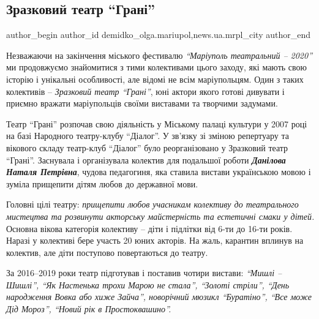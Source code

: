  
 
 
 
 
 
\subsection{Зразковий театр \enquote{Грані}}
\label{sec:25_10_2020.stz.news.ua.mrpl_city.1.zrazkovyj_teatr_grani}
 
\ifcmt
 author_begin
   author_id demidko_olga.mariupol,news.ua.mrpl_city
 author_end
\fi

Незважаючи на закінчення міського фестивалю \emph{\enquote{Маріуполь театральний – 2020}} ми
продовжуємо знайомитися з тими колективами цього заходу, які мають свою історію
і унікальні особливості, але відомі не всім маріупольцям. Один з таких
колективів – \emph{Зразковий театр \enquote{Грані}}, юні актори якого готові дивувати і
приємно вражати маріупольців своїми виставами та творчими задумами.


Театр \enquote{Грані} розпочав свою діяльність у Міському палаці культури у 2007 році
на базі Народного театру-клубу \enquote{Діалог}. У зв'язку зі зміною репертуару та
вікового складу театр-клуб \enquote{Діалог} було реорганізовано у Зразковий театр
\enquote{Грані}. Заснувала і організувала колектив для подальшої роботи \emph{\textbf{Данілова Наталя
Петрівна}}, чудова педагогиня, яка ставила вистави українською мовою і зуміла
прищепити дітям любов до державної мови.

Головні цілі театру: \emph{прищепити любов учасникам колективу до театрального
мистецтва та розвинути акторську майстерність та естетичні смаки у дітей.}
Основна вікова категорія колективу – діти і підлітки від 6-ти до 16-ти років.
Наразі у колективі бере участь 20 юних акторів. На жаль, карантин вплинув на
колектив, але діти поступово повертаються до театру.

За 2016–2019 роки театр підготував і поставив чотири вистави: \emph{\enquote{Мишлі – Шишлі},
\enquote{Як Настенька трохи Марою не стала}, \enquote{Золоті стріли}, \enquote{День народження Вовка
або хиже Зайча}, новорічний мюзикл \enquote{Буратіно}, \enquote{Все може Дід Мороз}, \enquote{Новий рік
в Простоквашино}.}

